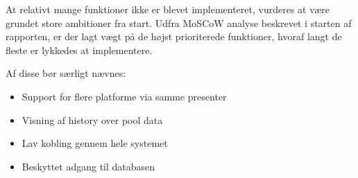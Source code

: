 At relativt mange funktioner ikke er blevet implementeret, vurderes at være grundet store ambitioner fra start. Udfra MoSCoW analyse beskrevet i starten af rapporten, er der lagt vægt på de højst prioriterede funktioner, hvoraf langt de fleste er lykkedes at implementere.

Af disse bør særligt nævnes:
\begin{itemize}
	\item Support for flere platforme via samme presenter
	\item Visning af history over pool data
	\item Lav kobling gennem hele systemet
	\item Beskyttet adgang til databasen
\end{itemize}